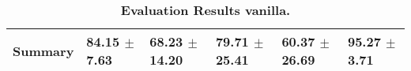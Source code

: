 \begin{table}[htb]
{\begin{tabular}{llllll}
\midrule
\textbf{Summary                                  } &        \phantom{0}84.15 $\pm$ \phantom{0}7.63 &                      \phantom{0}68.23 $\pm$ 14.20 &                  \phantom{0}79.71 $\pm$ 25.41 &            \phantom{0}60.37 $\pm$ 26.69 &  \phantom{0}95.27 $\pm$ \phantom{0}3.71 \\
\bottomrule
\end{tabular}%
}
\caption{\textbf{Evaluation Results vanilla.}}
\label{tab:eval-results}
\end{table}


